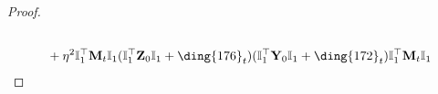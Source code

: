 \documentclass{article}
\theoremstyle{plain}
\theoremstyle{remark}
\def\bY{\mathbf{Y}}
\def\bZ{\mathbf{Z}}
\newcommand{\cc}[1]{\text{\ding{\number\numexpr#1 + 171\relax}}}
\begin{document}
\begin{proof}
\begin{align*}
        \\
        &~~~~ 
            + \eta^2 \mathbb{I}_{1}^\top\mathbf{M}_{t}\mathbb{I}_{1}
            (\mathbb{I}_{1}^\top\bZ_0\mathbb{I}_{1}+\cc{5}_t)
            (\mathbb{I}_{1}^\top\bY_0\mathbb{I}_{1}+\cc{1}_t)
            \mathbb{I}_{1}^\top\mathbf{M}_{t}\mathbb{I}_{1}
    \end{align*}


\end{proof}
\end{document}

